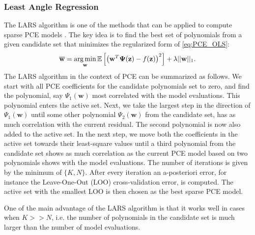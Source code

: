 \subsubsection{Least Angle Regression}
The LARS algorithm \cite{efron2004} is one of the methods that can be applied to compute sparse PCE models \cite{BlatmanThesis}. The key idea is to find the best set of polynomials from a given candidate set that minimizes the regularized form of \eqref{eq:PCE_OLS}:
\begin{equation}\label{regularized_LS}
\mathbf{\overline{w}} = \operatorname*{arg\,min}_{\mathbf{w}} \mathbb{E}\left[\left(\mathbf{w}^T \boldsymbol{\Psi}(\mathbf{z}) - f(\mathbf{z})\right)^2\right] + \lambda ||\mathbf{w}||_1.
\end{equation}
The LARS algorithm in the context of PCE can be summarized as follows. We start with all PCE coefficients for the candidate polynomials set to zero, and find the polynomial, say $\Psi_1(\mathbf{w})$ most correlated with the model evaluations. This polynomial enters the active set. Next, we take the largest step in the direction of $\Psi_1(\mathbf{w})$ until some other polynomial $\Psi_2(\mathbf{w})$ from the candidate set, has as much correlation with the current residual. The second polynomial is now also added to the active set. In the next step, we move both the coefficients in the active set towards their least-square values until a third polynomial from the candidate set shows as much correlation as the current PCE model based on two polynomials shows with the model evaluations. The number of iterations is given by the minimum of $\{K,N\}$. After every iteration an a-posteriori error, for instance the Leave-One-Out (LOO) cross-validation error, is computed. The active set with the smallest LOO is then chosen as the best sparse PCE model.

One of the main advantage of the LARS algorithm is that it works well in cases when $K>>N$, i.e. the number of polynomials in the candidate set is much larger than the number of model evaluations.




